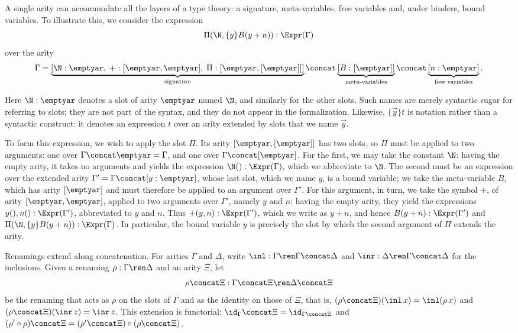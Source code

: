 \begin{example}\label{ex:layers}
    A single arity can accommodate all the layers of a type theory: a signature, meta-variables, free variables and, under binders, bound variables. To illustrate this, we consider the expression
    \[
    \Pi(\N, \{y\}B(y + n)) : \Expr(\Gamma)
    \]
    over the arity
    \[
    \Gamma = \underbrace{[\N : \emptyar,\; {+} : [\emptyar, \emptyar],\; \Pi : [\emptyar, [\emptyar]]]}_{\text{signature}} \concat \underbrace{[B : [\emptyar]]}_{\text{meta-variables}} \concat \underbrace{[n : \emptyar]}_{\text{free variables}}.
    \]

    Here $\N : \emptyar$ denotes a slot of arity $\emptyar$ named $\N$, and similarly for the other slots. Such names are merely syntactic sugar for referring to slots; they are not part of the syntax, and they do not appear in the formalization. Likewise, $\{\vec y\}t$ is notation rather than a syntactic construct: it denotes an expression $t$ over an arity extended by slots that we name $\vec y$.

    To form this expression, we wish to apply the slot $\Pi$. Its arity $[\emptyar, [\emptyar]]$ has two slots, so $\Pi$ must be applied to two arguments: one over $\Gamma \concat \emptyar = \Gamma$, and one over $\Gamma \concat [\emptyar]$. For the first, we may take the constant $\N$: having the empty arity, it takes no arguments and yields the expression $\N() : \Expr(\Gamma)$, which we abbreviate to $\N$. The second must be an expression over the extended arity $\Gamma' = \Gamma \concat [y : \emptyar]$, whose last slot, which we name $y$, is a bound variable; we take the meta-variable $B$, which has arity $[\emptyar]$ and must therefore be applied to an argument over $\Gamma'$. For this argument, in turn, we take the symbol ${+}$, of arity $[\emptyar, \emptyar]$, applied to two arguments over $\Gamma'$, namely $y$ and $n$: having the empty arity, they yield the expressions $y(), n() : \Expr(\Gamma')$, abbreviated to $y$ and $n$. Thus ${+}(y, n) : \Expr(\Gamma')$, which we write as $y + n$, and hence $B(y + n) : \Expr(\Gamma')$ and $\Pi(\N, \{y\}B(y + n)) : \Expr(\Gamma)$. In particular, the bound variable $y$ is precisely the slot by which the second argument of $\Pi$ extends the arity.
\end{example}

Renamings extend along concatenation. For arities $\Gamma$ and $\Delta$, write $\inl : \Gamma \ren \Gamma \concat \Delta$ and $\inr : \Delta \ren \Gamma \concat \Delta$ for the inclusions. Given a renaming $\rho : \Gamma \ren \Delta$ and an arity $\Xi$, let
\[
\rho \concat \Xi : \Gamma \concat \Xi \ren \Delta \concat \Xi
\]
be the renaming that acts as $\rho$ on the slots of $\Gamma$ and as the identity on those of $\Xi$, that is, $(\rho \concat \Xi)(\inl\, x) = \inl(\rho\, x)$ and $(\rho \concat \Xi)(\inr\, z) = \inr\, z$. This extension is functorial: $\id_\Gamma \concat \Xi = \id_{\Gamma \concat \Xi}$ and $(\rho' \circ \rho) \concat \Xi = (\rho' \concat \Xi) \circ (\rho \concat \Xi)$.

